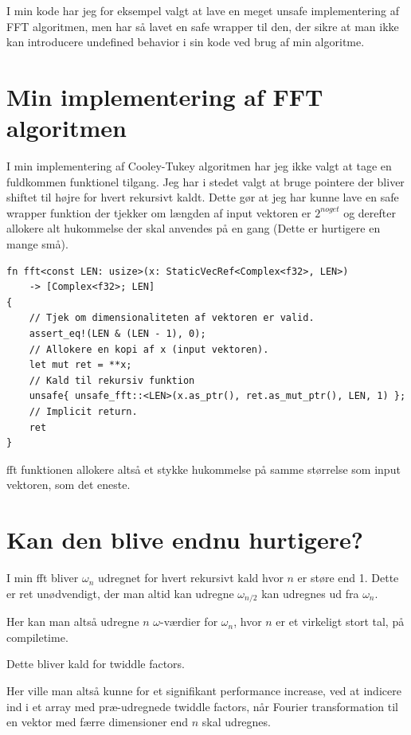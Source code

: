 \documentclass[11pt,a4paper]{article}
\begin{document}
I min kode har jeg for eksempel valgt at lave en meget unsafe implementering af FFT algoritmen,
men har så lavet en safe wrapper til den, der sikre at man ikke kan introducere undefined behavior i sin kode ved brug af min algoritme.

\section{Min implementering af FFT algoritmen}
\label{sec:orgf7c2b6f}
I min implementering af Cooley-Tukey algoritmen har jeg ikke valgt at tage en fuldkommen funktionel tilgang.
Jeg har i stedet valgt at bruge pointere der bliver shiftet til højre for hvert rekursivt kaldt.
Dette gør at jeg har kunne lave en safe wrapper funktion der tjekker om længden af input vektoren er \(2^{noget}\)
og derefter allokere alt hukommelse der skal anvendes på en gang (Dette er hurtigere en mange små).

\begin{verbatim}
fn fft<const LEN: usize>(x: StaticVecRef<Complex<f32>, LEN>)
    -> [Complex<f32>; LEN]
{
    // Tjek om dimensionaliteten af vektoren er valid.
    assert_eq!(LEN & (LEN - 1), 0);
    // Allokere en kopi af x (input vektoren).
    let mut ret = **x;
    // Kald til rekursiv funktion
    unsafe{ unsafe_fft::<LEN>(x.as_ptr(), ret.as_mut_ptr(), LEN, 1) };
    // Implicit return.
    ret
}
\end{verbatim}

fft funktionen allokere altså et stykke hukommelse på samme størrelse som input vektoren, som det eneste.

\section{Kan den blive endnu hurtigere?}
\label{sec:orge9bda4f}
I min fft bliver \(\omega_n\) udregnet for hvert rekursivt kald hvor \(n\) er støre end 1.
Dette er ret unødvendigt, der man altid kan udregne \(\omega_{n/2}\) kan udregnes ud fra \(\omega_n\).

Her kan man altså udregne \(n\) \(\omega\)-værdier for \(\omega_n\), hvor \(n\) er et virkeligt stort tal,
på compiletime.

Dette bliver kald for twiddle factors.

Her ville man altså kunne for et signifikant performance increase,
ved at indicere ind i et array med præ-udregnede twiddle factors, når Fourier transformation til en vektor med færre dimensioner end \(n\) skal udregnes.
\end{document}
